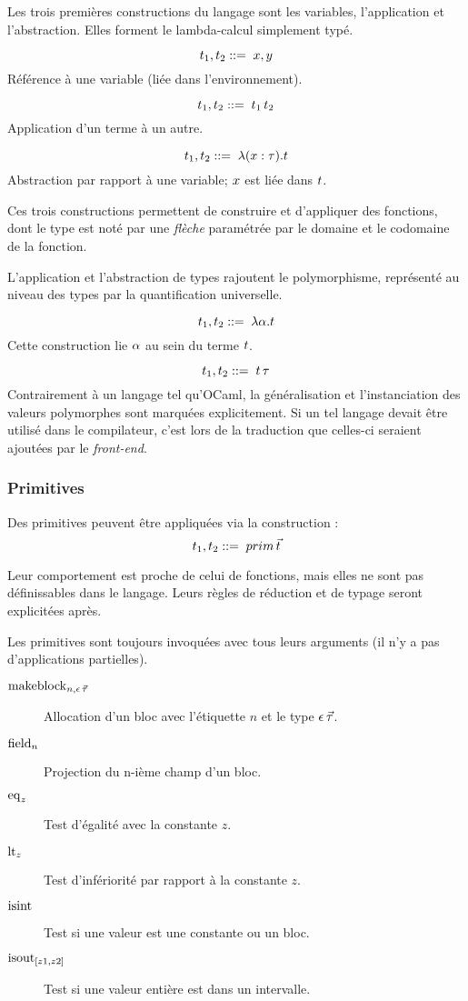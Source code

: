 Les trois premières constructions du langage sont les variables, l'application
et l'abstraction. Elles forment le lambda-calcul simplement typé.

$$t_1, t_2 ::= \; x, y$$
%
Référence à une variable (liée dans l'environnement).

$$t_1, t_2 ::= \;   t_1 \, t_2$$
%
Application d'un terme à un autre.

$$t_1, t_2 ::= \;   \lambda (x : \tau) . t$$
%
Abstraction par rapport à une variable; $x$ est liée dans $t$.

Ces trois constructions permettent de construire et d'appliquer des fonctions,
dont le type est noté par une \emph{flèche} paramétrée par le domaine et le
codomaine de la fonction.

L'application et l'abstraction de types rajoutent le polymorphisme, représenté
au niveau des types par la quantification universelle.

$$t_1, t_2 ::= \;   \lambda \alpha . t$$
%
Cette construction lie $\alpha$ au sein du terme $t$.

$$t_1, t_2 ::= \;   t \, \tau $$
%
Contrairement à un langage tel qu'OCaml, la généralisation et l'instanciation
des valeurs polymorphes sont marquées explicitement. Si un tel langage devait
être utilisé dans le compilateur, c'est lors de la traduction que celles-ci
seraient ajoutées par le \emph{front-end}.

\subsubsection{Primitives}

Des primitives peuvent être appliquées via la construction :
%
$$t_1, t_2 ::= \; prim \, \vec{t}$$

Leur comportement est proche de celui de fonctions, mais elles ne sont pas
définissables dans le langage. Leurs règles de réduction et de typage seront
explicitées après.

Les primitives sont toujours invoquées avec tous leurs arguments (il n'y a pas
d'applications partielles).

\begin{description}
  \item[$\operatorname{makeblock}_{n,\epsilon \, \vec{\tau}}$] Allocation d'un bloc avec l'étiquette $n$
    et le type $\epsilon \, \vec{\tau}$.
  \item[$\operatorname{field}_n$] Projection du n-ième champ d'un bloc.
  \item[$\operatorname{eq}_z$] Test d'égalité avec la constante $z$.
  \item[$\operatorname{lt}_z$] Test d'infériorité par rapport à la constante $z$.
  \item[$\operatorname{isint}$] Test si une valeur est une constante ou un bloc.
  \item[$\operatorname{isout}_{[z1,z2]}$] Test si une valeur entière est dans un
    intervalle.
\end{description}

